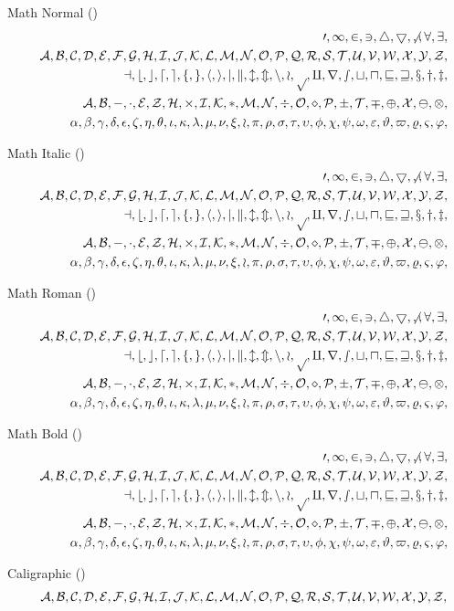 \documentclass[12pt, a4paper, oneside]{article}
\theoremstyle{Plain}
\theoremstyle{Definition}
\theoremstyle{Remark}
\begin{document}
\begin{appendix}
Math Normal (\texttt{\string\mathnormal})
\def\test#1{\mathnormal{#1},}
\begin{eqnarray*}
  && {\testnums}\\
  && {\testupper}\\
  && {\testlower}\\
  && {\testupgreek}\\
  && {\testlowgreek}
\end{eqnarray*}%

Math Italic (\texttt{\string\mathit})
\def\test#1{\mathit{#1},}
\begin{eqnarray*}
  && {\testnums}\\
  && {\testupper}\\
  && {\testlower}\\
  && {\testupgreek}\\
  && {\testlowgreek}
\end{eqnarray*}%

Math Roman (\texttt{\string\mathrm})
\def\test#1{\mathrm{#1},}
\begin{eqnarray*}
  && {\testnums}\\
  && {\testupper}\\
  && {\testlower}\\
  && {\testupgreek}\\
  && {\testlowgreek}
\end{eqnarray*}%


Math Bold (\texttt{\string\mathbf})
\def\test#1{\mathbf{#1},}
\begin{eqnarray*}
  && {\testnums}\\
  && {\testupper}\\
  && {\testlower}\\
  && {\testupgreek}\\
  && {\testlowgreek}
\end{eqnarray*}%

Caligraphic (\texttt{\string\mathcal})
\def\test#1{\mathcal{#1},}
\begin{eqnarray*}
  && {\testupper}
\end{eqnarray*}%


\end{appendix}
\end{document}
